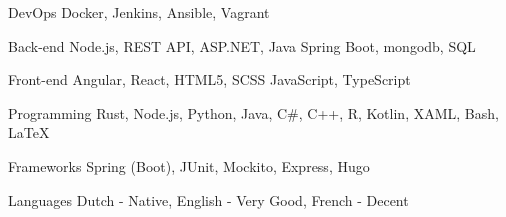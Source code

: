 

\begin{cvskills}

  \cvskill
    {DevOps} %
    {Docker, Jenkins, Ansible, Vagrant} %

  \cvskill
    {Back-end} %
    {Node.js, REST API, ASP.NET, Java Spring Boot, mongodb, SQL} %

  \cvskill
    {Front-end} %
    {Angular, React, HTML5, SCSS JavaScript, TypeScript} %

  \cvskill
    {Programming} %
    {Rust, Node.js, Python, Java, C\#, C++, R, Kotlin, XAML, Bash, LaTeX} %

  \cvskill
    {Frameworks} %
	{Spring (Boot), JUnit, Mockito, Express, Hugo} %

  \cvskill
    {Languages} %
	{Dutch - Native, English - Very Good, French - Decent} %

\end{cvskills}
